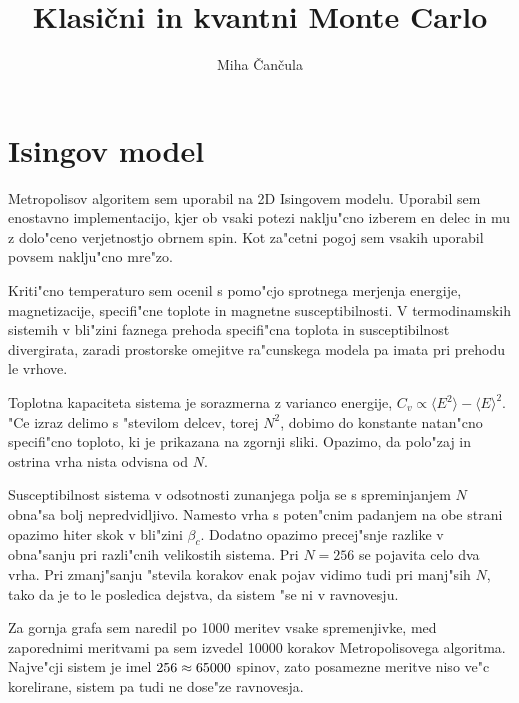 \documentclass[a4paper,10pt]{article}
\title{Klasi\v cni in kvantni Monte Carlo}
\author{Miha \v Can\v cula}
\begin{document}
\maketitle

\section{Isingov model}

Metropolisov algoritem sem uporabil na 2D Isingovem modelu. 
Uporabil sem enostavno implementacijo, kjer ob vsaki potezi naklju"cno izberem en delec in mu z dolo"ceno verjetnostjo obrnem spin. 
Kot za"cetni pogoj sem vsakih uporabil povsem naklju"cno mre"zo. 

Kriti"cno temperaturo sem ocenil s pomo"cjo sprotnega merjenja energije, magnetizacije, specifi"cne toplote in magnetne susceptibilnosti. 
V termodinamskih sistemih v bli"zini faznega prehoda specifi"cna toplota in susceptibilnost divergirata, zaradi prostorske omejitve ra"cunskega modela pa imata pri prehodu le vrhove. 

\begin{figure}[H]
 \centering
 
\end{figure}

Toplotna kapaciteta sistema je sorazmerna z varianco energije, $C_v \propto \langle E^2 \rangle - \langle E \rangle^2$. 
"Ce izraz delimo s "stevilom delcev, torej $N^2$, dobimo do konstante natan"cno specifi"cno toploto, ki je prikazana na zgornji sliki. 
Opazimo, da polo"zaj in ostrina vrha nista odvisna od $N$. 

\begin{figure}[H]
 \centering
 
\end{figure}

Susceptibilnost sistema v odsotnosti zunanjega polja se s spreminjanjem $N$ obna"sa bolj nepredvidljivo. 
Namesto vrha s poten"cnim padanjem na obe strani opazimo hiter skok v bli"zini $\beta_c$. 
Dodatno opazimo precej"snje razlike v obna"sanju pri razli"cnih velikostih sistema. 
Pri $N=256$ se pojavita celo dva vrha. 
Pri zmanj"sanju "stevila korakov enak pojav vidimo tudi pri manj"sih $N$, tako da je to le posledica dejstva, da sistem "se ni v ravnovesju. 

Za gornja grafa sem naredil po 1000 meritev vsake spremenjivke, med zaporednimi meritvami pa sem izvedel 10000 korakov Metropolisovega algoritma. 
Najve"cji sistem je imel $256 \time 256 \approx 65000$ spinov, zato posamezne meritve niso ve"c korelirane, sistem pa tudi ne dose"ze ravnovesja. 
\end{document}
